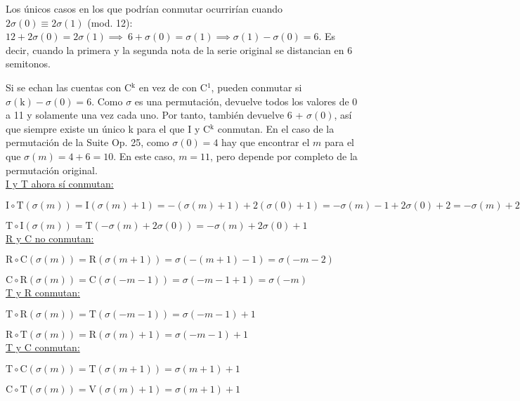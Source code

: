 		Los únicos casos en los que podrían conmutar ocurrirían cuando $2\sigma\left(0\right)\equiv2\sigma(1)$ (mod. 12): $12+2\sigma\left(0\right)=2\sigma\left(1\right)\implies\ 6+\sigma\left(0\right)=\sigma\left(1\right)\implies \sigma\left(1\right)-\sigma\left(0\right)=6$. Es decir, cuando la primera y la segunda nota de la serie original se distancian en 6 semitonos.
		
		Si se echan las cuentas con C$^\text{k}$ en vez de con C$^1$, pueden conmutar si $\sigma\left(\text{k}\right)-\sigma\left(0\right)=6$. Como $\sigma$ es una permutación, devuelve todos los valores de 0 a 11 y solamente una vez cada uno. Por tanto, también devuelve 6 + $\sigma(0)$, así que siempre existe un único k para el que I y C$^\text{k}$ conmutan. En el caso de la permutación de la Suite Op. 25, como $\sigma\left(0\right)=4$ hay que encontrar el $m$ para el que $\sigma\left(m\right)=4+6=10$. En este caso, $m=11$, pero depende por completo de la permutación original.\\
		
		\underline{I y T ahora sí conmutan:}
		
		$\text{I}\circ\text{T}(\sigma(m))=\text{I}(\sigma(m)+1)=-(\sigma(m)+1) + 2(\sigma(0)+1)=-\sigma(m)-1+2\sigma(0)+2=-\sigma(m)+2\sigma(0)+1$
		
		$\text{T}\circ\text{I}(\sigma(m))=\text{T}(-\sigma(m)+2\sigma(0))=-\sigma(m)+2\sigma(0)+1$\\
		
		\underline{R y C no conmutan:}
		
		$\text{R}\circ\text{C}(\sigma(m))=\text{R}(\sigma(m+1))=\sigma(-(m+1)-1)=\sigma(-m-2)$
		
		$\text{C}\circ\text{R}(\sigma(m))=\text{C}(\sigma(-m-1))=\sigma(-m-1+1)=\sigma(-m)$\\
		
		\underline{T y R conmutan:}
		
		$\text{T}\circ\text{R}(\sigma(m))=\text{T}(\sigma(-m-1))=\sigma(-m-1)+1$
		
		$\text{R}\circ\text{T}(\sigma(m))=\text{R}(\sigma(m)+1)=\sigma(-m-1)+1$\\
		
		\underline{T y C conmutan:}
		
		$\text{T}\circ\text{C}(\sigma(m))=\text{T}(\sigma(m+1))=\sigma(m+1)+1$
		
		$\text{C}\circ\text{T}(\sigma(m))=\text{V}(\sigma(m)+1)=\sigma(m+1)+1$